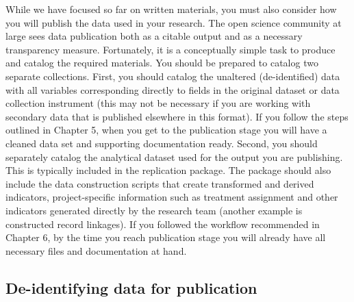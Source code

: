 While we have focused so far on written materials,
you must also consider how you will publish
the data used in your research.
The open science community at large sees data publication
both as a citable output and as a necessary transparency measure.
Fortunately, it is a conceptually simple task to produce
and catalog the required materials.
You should be prepared to catalog two separate collections.
First, you should catalog the unaltered (de-identified) data
with all variables corresponding directly
to fields in the original dataset or data collection instrument
(this may not be necessary if you are working with secondary data that is published elsewhere in this format).
If you follow the steps outlined in Chapter 5,
when you get to the publication stage you will have
a cleaned data set and supporting documentation ready.
Second, you should separately catalog 
the analytical dataset used for the output you are publishing.
This is typically included in the replication package. 
The package should also include the data construction scripts
that create transformed and derived indicators,
project-specific information
such as treatment assignment and other indicators
generated directly by the research team (another example is constructed record linkages).
If you followed the workflow recommended in Chapter 6,
by the time you reach publication stage you will already have all necessary 
files and documentation at hand.

\subsection{De-identifying data for publication}


